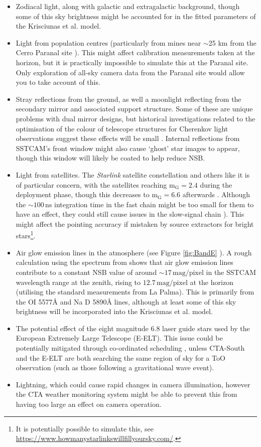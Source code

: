 \begin{itemize}
    \item Zodiacal light, along with galactic and extragalactic background, though some of this sky brightness might be accounted for in the fitted parameters of the Krisciunas et al. model.
    \item Light from population centres (particularly from mines near $\sim$25 km from the Cerro Paranal site \cite{cpmines}). This might affect calibration measurements taken at the horizon, but it is practically impossible to simulate this at the Paranal site. Only exploration of all-sky camera data from the Paranal site would allow you to take account of this.
    \item Stray reflections from the ground, as well a moonlight reflecting from the secondary mirror and associated support structure. Some of these are unique problems with dual mirror designs, but historical investigations related to the optimisation of the colour of telescope structures for Cherenkov light observations suggest these effects will be small \cite{pinktelescope}. Internal reflections from SSTCAM's front window might also cause `ghost' star images to appear, though this window will likely be coated to help reduce NSB.
    \item Light from satellites. The \textit{Starlink} satellite constellation and others like it is of particular concern, with the satellites reaching $\mathrm{m_G=2.4}$ during the deployment phase, though this decreases to $\mathrm{m_G=6.6}$ afterwards \cite{starlink}. Although the $\mathrm{\sim 100\,ns}$ integration time in the fast chain might be too small for them to have an effect, they could still cause issues in the slow-signal chain \cite{starlinkcta}). This might affect the pointing accuracy if mistaken by source extractors for bright stars\footnote{It is potentially possible to simulate this, see \url{https://www.howmanystarlinkswillfillyoursky.com/}.}.
    \item Air glow emission lines in the atmosphere (see Figure \ref{fig:BandE} \cite{BandE}). A rough calculation using the spectrum from \cite{BandE} shows that air glow emission lines contribute to a constant NSB value of around $\mathrm{\sim17\,mag/pixel}$ in the SSTCAM wavelength range at the zenith, rising to $\mathrm{12.7\,mag/pixel}$ at the horizon (utilising the standard \cite{BandE} measurements from La Palma). This is primarily from the OI 5577\r{A} and Na D 5890\r{A} lines, although at least some of this sky brightness will be incorporated into the Krisciunas et al. model.
    \item The potential effect of the eight magnitude 6.8 laser guide stars used by the European Extremely Large Telescope (E-ELT). This issue could be potentially mitigated through co-ordinated scheduling \cite{gauglasers}, unless CTA-South and the E-ELT are both searching the same region of sky for a ToO observation (such as those following a gravitational wave event).
    \item Lightning, which could cause rapid changes in camera illumination, however the CTA weather monitoring system might be able to prevent this from having too large an effect on camera operation.
\end{itemize}
